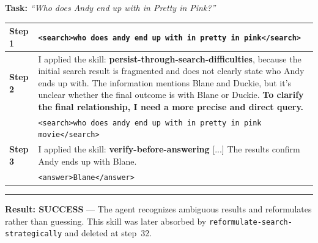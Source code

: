 \documentclass{article}
\theoremstyle{plain}
\theoremstyle{definition}
\theoremstyle{remark}
\begin{document}
\begin{tcolorbox}[
    colback=white, colframe=stage1color, width=\textwidth, sharp corners,
    boxrule=0.8pt, left=5pt, right=5pt, top=5pt, bottom=5pt,
    title=\textbf{Case 2 (Stage 1, Step 11): Search Resilience --- persist-through-search-difficulties},
    fonttitle=\sffamily\small, colbacktitle=stage1color!10, coltitle=black
]
\small

\textbf{Task:} \textit{``Who does Andy end up with in Pretty in Pink?''}

\vspace{4pt}
\begin{tabularx}{\linewidth}{@{}p{1.0cm} X@{}}
    \textbf{Step 1} & \texttt{<search>who does andy end up with in pretty in pink</search>} \\
    \midrule
    \textbf{Step 2} & I applied the skill: \textbf{\textcolor{skillcolor}{persist-through-search-difficulties}}, because the initial search result is fragmented and does not clearly state who Andy ends up with. The information mentions Blane and Duckie, but it's unclear whether the final outcome is with Blane or Duckie. \textbf{To clarify the final relationship, I need a more precise and direct query.} \\
    & \texttt{<search>who does andy end up with in pretty in pink movie</search>} \\
    \midrule
    \textbf{Step 3} & I applied the skill: \textbf{\textcolor{skillcolor}{verify-before-answering}} [...] The results confirm Andy ends up with Blane. \\
    & \texttt{<answer>Blane</answer>} \\
\end{tabularx}

\vspace{3pt}\hrule\vspace{3pt}
\textbf{\textcolor{successgreen}{Result: SUCCESS}} --- The agent recognizes ambiguous results and reformulates rather than guessing. This skill was later absorbed by \texttt{reformulate-search-strategically} and deleted at step~32.
\end{tcolorbox}

\vspace{4pt}
\end{document}
